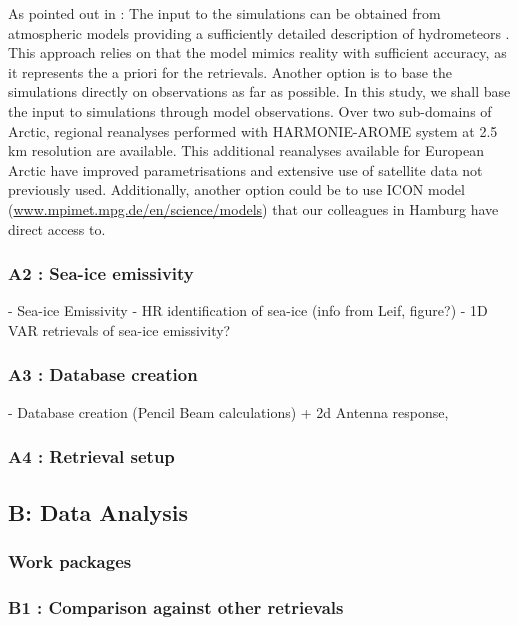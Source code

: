 \documentclass[12pt,oneside,a4paper]{article}
\begin{document}
As pointed out in \citet{eriksson:towar:20}: The input to the simulations can
be obtained from atmospheric models providing a sufficiently detailed
description of hydrometeors \citep[e.g.][]{wang2017statistical}. This approach
relies on that the model mimics reality with sufficient accuracy, as it
represents the a priori for the retrievals. Another option is to base the
simulations directly on observations as far as possible. In this study, we shall base the input to simulations through model observations. Over two sub-domains of Arctic, regional reanalyses performed with HARMONIE-AROME system at 2.5\,km resolution are available. This additional reanalyses available for European Arctic have improved parametrisations and extensive use of satellite data not previously used. Additionally, another option could be to use ICON model
(\url{www.mpimet.mpg.de/en/science/models}) that our colleagues in Hamburg have direct access to. 

\subsubsection*{A2 : Sea-ice emissivity}


	- Sea-ice Emissivity 
		- HR identification of sea-ice 	(info from Leif, figure?)
		- 1D VAR retrievals of sea-ice emissivity?  
	
\subsubsection*{A3 : Database creation}
	
	- Database creation (Pencil Beam calculations) +  2d Antenna response, 
	

\subsubsection*{A4 : Retrieval setup}	
 
\subsection{B: Data Analysis}
\subsubsection{Work packages}

\subsubsection*{B1 : Comparison against other retrievals}
\end{document}
